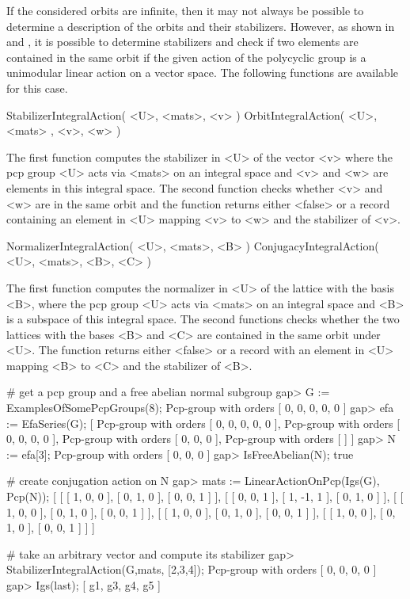 If the considered orbits are infinite, then it may not always be possible
to determine a description of the orbits and their stabilizers. However, 
as shown in \cite{EOs01} and \cite{Eic02}, it is possible to determine 
stabilizers and check if two elements are contained in the same orbit if 
the given action of the polycyclic group is a unimodular linear action on
a vector space. The following functions are available for this case.

\> StabilizerIntegralAction( <U>, <mats>, <v> )
\> OrbitIntegralAction( <U>, <mats> , <v>, <w> )

The first function computes the stabilizer in <U> of the vector <v> where
the pcp group <U> acts via <mats> on an integral space and <v> and <w> are 
elements in this integral space. The second function checks whether <v> and 
<w> are in the same orbit and the function returns either <false> or a 
record containing an element in <U> mapping <v> to <w> and the stabilizer 
of <v>. 

\> NormalizerIntegralAction( <U>, <mats>, <B> )
\> ConjugacyIntegralAction( <U>, <mats>, <B>, <C> )

The first function computes the normalizer in <U> of the lattice with the
basis <B>, where the pcp group <U> acts via <mats> on an integral space and
<B> is a subspace of this integral space. The second functions checks whether
the two lattices with the bases <B> and <C> are contained in the same orbit 
under <U>. The function returns either <false> or a record with an element 
in <U> mapping <B> to <C> and the stabilizer of <B>.

\beginexample
# get a pcp group and a free abelian normal subgroup
gap> G := ExamplesOfSomePcpGroups(8);
Pcp-group with orders [ 0, 0, 0, 0, 0 ]
gap> efa := EfaSeries(G);
[ Pcp-group with orders [ 0, 0, 0, 0, 0 ],
  Pcp-group with orders [ 0, 0, 0, 0 ], 
  Pcp-group with orders [ 0, 0, 0 ],
  Pcp-group with orders [  ] ]
gap> N := efa[3];
Pcp-group with orders [ 0, 0, 0 ]
gap> IsFreeAbelian(N);
true

# create conjugation action on N
gap> mats := LinearActionOnPcp(Igs(G), Pcp(N));
[ [ [ 1, 0, 0 ], [ 0, 1, 0 ], [ 0, 0, 1 ] ],
  [ [ 0, 0, 1 ], [ 1, -1, 1 ], [ 0, 1, 0 ] ],
  [ [ 1, 0, 0 ], [ 0, 1, 0 ], [ 0, 0, 1 ] ],
  [ [ 1, 0, 0 ], [ 0, 1, 0 ], [ 0, 0, 1 ] ],
  [ [ 1, 0, 0 ], [ 0, 1, 0 ], [ 0, 0, 1 ] ] ]

# take an arbitrary vector and compute its stabilizer
gap> StabilizerIntegralAction(G,mats, [2,3,4]);
Pcp-group with orders [ 0, 0, 0, 0 ]
gap> Igs(last);
[ g1, g3, g4, g5 ]

